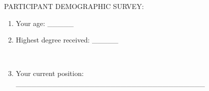 \documentclass[12pt, a4paper, oneside]{article}
\providecommand{\tightlist}{%
  \setlength{\itemsep}{0pt}\setlength{\parskip}{0pt}}
\begin{document}
%
%
%
%
%
%
%
%
%
%
%
%
%
%
%
%
%
%
%
%
%
%
%
%
%
%
%
%
%
%
%

{PARTICIPANT DEMOGRAPHIC SURVEY:}

{}

\begin{enumerate}
\tightlist
\item
  {Your age: \_\_\_\_\_}
\end{enumerate}

{}

\begin{enumerate}
\setcounter{enumi}{1}
\tightlist
\item
  {Highest degree received: \_\_\_\_\_}
\end{enumerate}

{~~~~~~~~~}

\begin{enumerate}
\setcounter{enumi}{2}
\tightlist
\item
  {Your current position:
  \_\_\_\_\_\_\_\_\_\_\_\_\_\_\_\_\_\_\_\_\_\_\_\_\_\_\_\_\_\_\_\_\_\_\_\_}
\end{enumerate}
\end{document}
